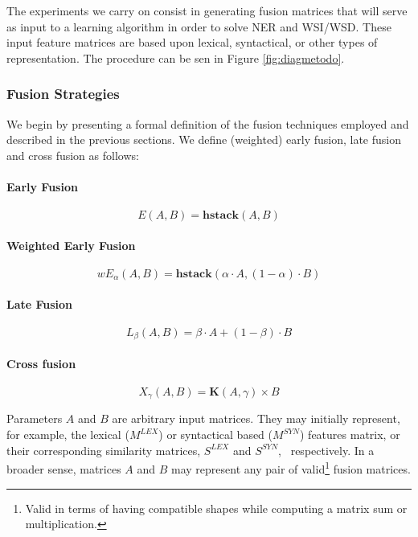 The experiments we carry on consist in generating fusion matrices that will serve as input to a learning algorithm in order to solve NER and WSI/WSD. These input feature matrices are based upon lexical, syntactical, or other types of representation. The procedure can be sen in Figure \ref{fig:diagmetodo}.

\subsubsection{Fusion Strategies}
We begin by presenting a  formal definition of the fusion techniques employed and described in the previous sections. We define (weighted) early fusion, late fusion and cross fusion as follows:
\paragraph{Early Fusion}
\begin{equation}
E(A,B) = \mathbf{hstack}(A , B)
\end{equation}
\paragraph{Weighted Early Fusion}
\begin{equation}
wE_\alpha(A,B) = \mathbf{hstack}(\alpha\cdot A , (1-\alpha)\cdot B)
\end{equation}
\paragraph{Late Fusion}
\begin{equation} \label{eq:late-fusion}
L_\beta(A,B) = \beta \cdot A + (1 - \beta)\cdot B
\end{equation}
\paragraph{Cross fusion}
\begin{equation}
X_{\gamma}(A,B) = \mathbf{K}(A,\gamma) \times B
\end{equation}


Parameters $A$ and $B$ are arbitrary input matrices. They may initially represent, for example,  the lexical ($M^{LEX}$) or syntactical based ($M^{SYN}$) features matrix, or their  corresponding similarity matrices, $S^{LEX}$ and  $S^{SYN}$, ~respectively. In a broader sense, matrices $A$ and $B$ may represent any pair of valid\footnote{Valid in terms of having compatible shapes while computing a matrix sum or multiplication.} fusion matrices. 

